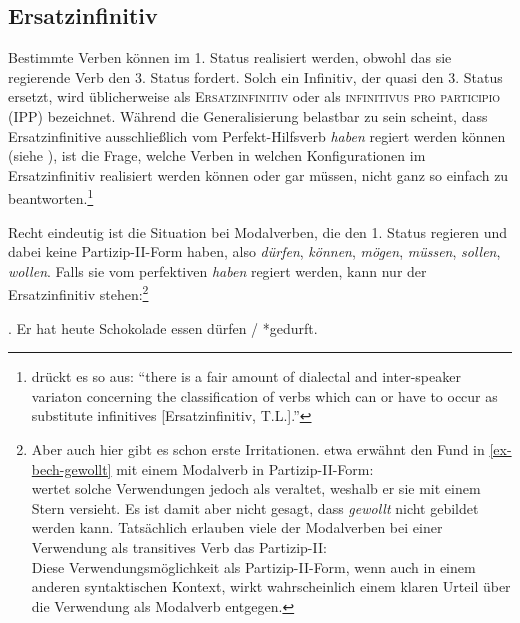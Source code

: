 \subsection{Ersatzinfinitiv}

Bestimmte Verben können im 1. Status realisiert werden, obwohl das sie regierende Verb den 3. Status fordert. Solch ein Infinitiv, der quasi den 3. Status ersetzt, wird üblicherweise als \textsc{Ersatzinfinitiv} oder als \textsc{infinitivus pro participio (IPP)} bezeichnet. Während die Generalisierung belastbar zu sein scheint, dass Ersatzinfinitive ausschlie\ss lich vom Perfekt-Hilfsverb {\it haben} regiert werden können (siehe \citealt[62ff]{Meurers:99}), ist die Frage, welche Verben in welchen Konfigurationen im Ersatzinfinitiv realisiert werden können oder gar müssen, nicht ganz so einfach zu beantworten.\footnote{\citet[53]{Meurers:99} drückt es so aus: "`there is a fair amount of dialectal and inter-speaker variaton concerning the classification of verbs which can or have to occur as substitute infinitives [Ersatzinfinitiv, T.L.]."' }

Recht eindeutig ist die Situation bei Modalverben, die den 1. Status regieren und dabei keine Partizip-II-Form haben, also \textit{dürfen}, \textit{können}, \textit{mögen}, \textit{müssen}, \textit{sollen}, \textit{wollen}. Falls sie vom perfektiven {\it haben} regiert werden, kann nur der Ersatzinfinitiv stehen:\footnote{Aber auch hier gibt es schon erste Irritationen. \cite{Bech:55} etwa erwähnt den Fund in \ref{ex-bech-gewollt} mit einem Modalverb in Partizip-II-Form:\\
\citet[53]{Meurers:99} wertet solche Verwendungen jedoch als veraltet, weshalb er sie mit einem Stern versieht. Es ist damit aber nicht gesagt, dass {\it gewollt} nicht gebildet werden kann. Tatsächlich erlauben viele der Modalverben bei einer Verwendung als transitives Verb das Partizip-II:\\
Diese Verwendungsmöglichkeit als Partizip-II-Form, wenn auch in einem anderen syntaktischen Kontext, wirkt wahrscheinlich einem klaren Urteil über die Verwendung als Modalverb entgegen.}
  
\ex. Er hat heute Schokolade essen dürfen / *gedurft. \hfill \citep[(82)]{Meurers:99} 


